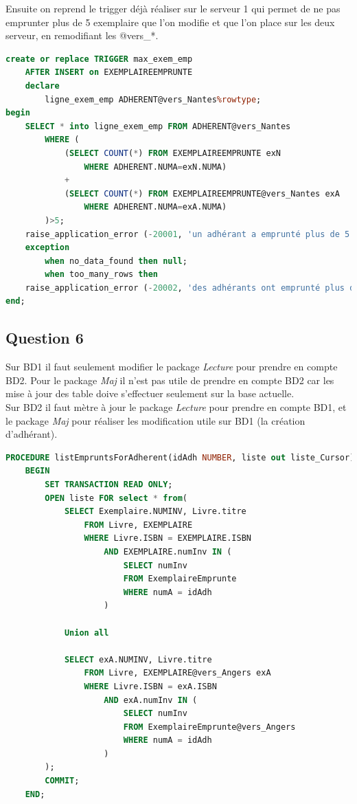 \documentclass{article}
\begin{document}
Ensuite on reprend le trigger déjà réaliser sur le serveur 1 qui permet de ne pas emprunter plus de 5 exemplaire que l'on modifie et que l'on place sur les deux serveur, en remodifiant les @vers\_*.
\begin{lstlisting}[language=SQL, caption= Trigger Max exemplaire DB2]
create or replace TRIGGER max_exem_emp
    AFTER INSERT on EXEMPLAIREEMPRUNTE
    declare
        ligne_exem_emp ADHERENT@vers_Nantes%rowtype;
begin
    SELECT * into ligne_exem_emp FROM ADHERENT@vers_Nantes 
        WHERE (
            (SELECT COUNT(*) FROM EXEMPLAIREEMPRUNTE exN
                WHERE ADHERENT.NUMA=exN.NUMA)
            +
            (SELECT COUNT(*) FROM EXEMPLAIREEMPRUNTE@vers_Nantes exA
                WHERE ADHERENT.NUMA=exA.NUMA)
        )>5;
    raise_application_error (-20001, 'un adhérant a emprunté plus de 5 exemplaires');
    exception
        when no_data_found then null;
        when too_many_rows then
    raise_application_error (-20002, 'des adhérants ont emprunté plus de 5 exemplaires');
end;
\end{lstlisting}

\subsection{Question 6}
Sur BD1 il faut seulement modifier le package \textit{Lecture} pour prendre en compte BD2. Pour le package \textit{Maj} il n'est pas utile de prendre en compte BD2 car les mise à jour des table doive s'effectuer seulement sur la base actuelle.
\\

Sur BD2 il faut mètre à jour le package \textit{Lecture} pour prendre en compte BD1, et le package \textit{Maj} pour réaliser les modification utile sur BD1 (la création d'adhérant).
\begin{lstlisting}[language=SQL, caption= Un procédure de \textit{Lecture} sur BD1]
PROCEDURE listEmpruntsForAdherent(idAdh NUMBER, liste out liste_Cursor) IS
    BEGIN
        SET TRANSACTION READ ONLY;
        OPEN liste FOR select * from(
            SELECT Exemplaire.NUMINV, Livre.titre
                FROM Livre, EXEMPLAIRE
                WHERE Livre.ISBN = EXEMPLAIRE.ISBN
                    AND EXEMPLAIRE.numInv IN (
                        SELECT numInv
                        FROM ExemplaireEmprunte
                        WHERE numA = idAdh
                    )

            Union all

            SELECT exA.NUMINV, Livre.titre
                FROM Livre, EXEMPLAIRE@vers_Angers exA
                WHERE Livre.ISBN = exA.ISBN
                    AND exA.numInv IN (
                        SELECT numInv
                        FROM ExemplaireEmprunte@vers_Angers
                        WHERE numA = idAdh
                    )
        );
        COMMIT;
    END;
\end{lstlisting}
\end{document}
